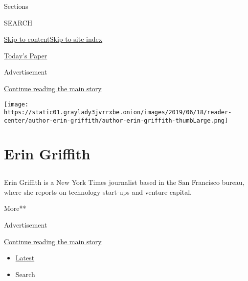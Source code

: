 Sections

SEARCH

\protect\hyperlink{site-content}{Skip to
content}\protect\hyperlink{site-index}{Skip to site index}

\href{https://myaccount.nytimes3xbfgragh.onion/auth/login?response_type=cookie\&client_id=vi}{}

\href{https://www.nytimes3xbfgragh.onion/section/todayspaper}{Today's
Paper}

Advertisement

\protect\hyperlink{after-top}{Continue reading the main story}

\texttt{[image: https://static01.graylady3jvrrxbe.onion/images/2019/06/18/reader-center/author-erin-griffith/author-erin-griffith-thumbLarge.png]}

\hypertarget{erin-griffith}{%
\section{Erin Griffith}\label{erin-griffith}}

\subsection{}

Erin Griffith is a New York Times journalist based in the San Francisco
bureau, where she reports on technology start-ups and venture capital.

More**

Advertisement

\protect\hyperlink{after-mid1}{Continue reading the main story}

\begin{itemize}
\tightlist
\item
  \protect\hyperlink{stream-panel}{Latest}
\item
  Search
\end{itemize}

